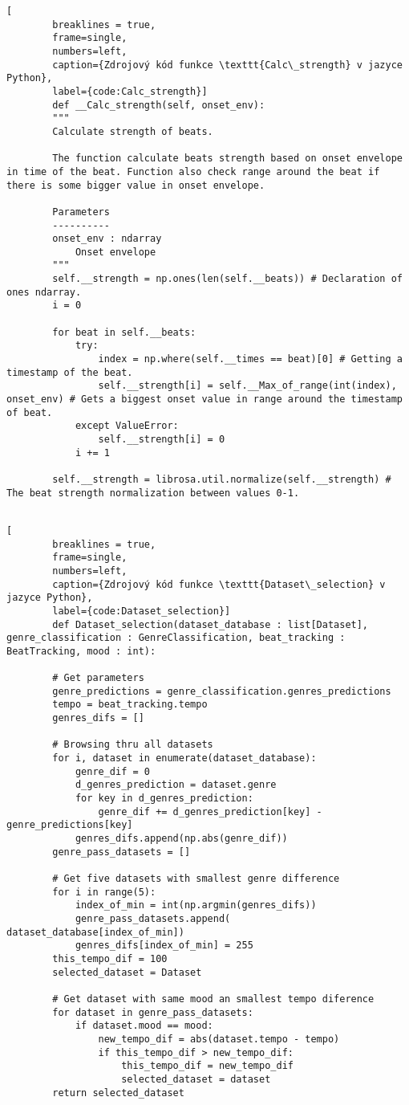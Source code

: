 \begin{minipage}{\linewidth}
	\begin{lstlisting}[
		breaklines = true,
		frame=single,
		numbers=left,
		caption={Zdrojový kód funkce \texttt{Calc\_strength} v jazyce Python},
		label={code:Calc_strength}]
		def __Calc_strength(self, onset_env):
		"""
		Calculate strength of beats.

		The function calculate beats strength based on onset envelope in time of the beat. Function also check range around the beat if there is some bigger value in onset envelope.

		Parameters
		----------
		onset_env : ndarray
			Onset envelope
		"""
		self.__strength = np.ones(len(self.__beats)) # Declaration of ones ndarray.
		i = 0

		for beat in self.__beats:
			try:
				index = np.where(self.__times == beat)[0] # Getting a timestamp of the beat.
				self.__strength[i] = self.__Max_of_range(int(index), onset_env) # Gets a biggest onset value in range around the timestamp of beat.
			except ValueError:
				self.__strength[i] = 0
			i += 1

		self.__strength = librosa.util.normalize(self.__strength) # The beat strength normalization between values 0-1.
	
	\end{lstlisting}
\end{minipage}

\begin{minipage}{\linewidth}
	\begin{lstlisting}[
		breaklines = true,
		frame=single,
		numbers=left,
		caption={Zdrojový kód funkce \texttt{Dataset\_selection} v jazyce Python},
		label={code:Dataset_selection}]
		def Dataset_selection(dataset_database : list[Dataset], genre_classification : GenreClassification, beat_tracking : BeatTracking, mood : int):

		# Get parameters 
		genre_predictions = genre_classification.genres_predictions
		tempo = beat_tracking.tempo
		genres_difs = []
	
		# Browsing thru all datasets
		for i, dataset in enumerate(dataset_database):
			genre_dif = 0
			d_genres_prediction = dataset.genre
			for key in d_genres_prediction:
				genre_dif += d_genres_prediction[key] - genre_predictions[key]
			genres_difs.append(np.abs(genre_dif))
		genre_pass_datasets = []
	
		# Get five datasets with smallest genre difference
		for i in range(5):
			index_of_min = int(np.argmin(genres_difs))
			genre_pass_datasets.append( dataset_database[index_of_min])
			genres_difs[index_of_min] = 255
		this_tempo_dif = 100
		selected_dataset = Dataset
		
		# Get dataset with same mood an smallest tempo diference
		for dataset in genre_pass_datasets:
			if dataset.mood == mood:
				new_tempo_dif = abs(dataset.tempo - tempo)
				if this_tempo_dif > new_tempo_dif:
					this_tempo_dif = new_tempo_dif
					selected_dataset = dataset
		return selected_dataset
	\end{lstlisting}
\end{minipage}

